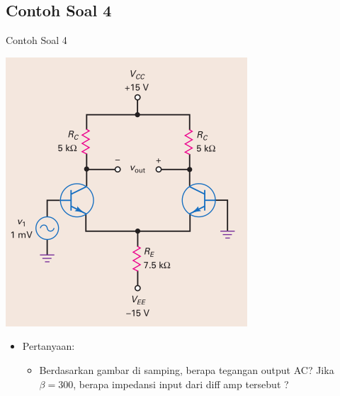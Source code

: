 \documentclass[aspectratio=169]{beamer}
\begin{document}
\subsection{Contoh Soal 4}
\begin{frame}{Contoh Soal 4}
	\begin{multicols}{2}
		\begin{center}
			\includegraphics[height=0.7\textheight]{gambar/01.diff-amp/01.contoh_soal_1-2}
		\end{center}
		\columnbreak
		\begin{itemize}
			\item Pertanyaan:
			\begin{itemize}
				\item Berdasarkan gambar di samping, berapa tegangan output AC? Jika $ \beta = 300 $, berapa impedansi input dari diff amp tersebut ?
			\end{itemize}
		\end{itemize}
	\end{multicols}
\end{frame}
\end{document}
